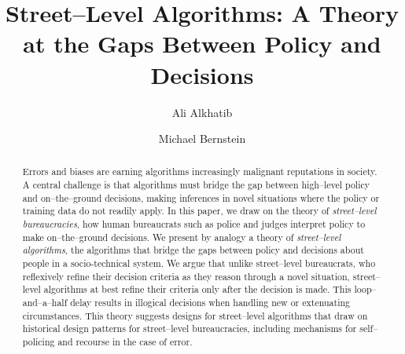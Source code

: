 \documentclass[sigchi]{acmart}
\newcommand{\ali}[1]{{\color{Red}[al2: #1]}}
\newcommand{\thesis}[1]{{\color{Orange}{#1}}}
\newcommand{\topic}[1]{{\color{Blue}#1}} %
\newcommand{\onlyinsubfile}[1]{#1}
\newcommand{\notinsubfile}[1]{}
\renewcommand{\topic}[1]{#1} %
\renewcommand{\thesis}[1]{#1} %
\begin{document}
\renewcommand{\topic}[1]{#1} %
\renewcommand{\thesis}[1]{#1} %
\renewcommand{\notinsubfile}[1]{#1}
\renewcommand{\onlyinsubfile}[1]{}

\title[Street--Level Algorithms]{Street--Level Algorithms: A Theory at the Gaps Between Policy and Decisions}


\author{Ali Alkhatib}

\author{Michael Bernstein}

\renewcommand{\shortauthors}{Alkhatib and Bernstein}


\begin{abstract}
Errors and biases are earning algorithms increasingly malignant reputations in society.
A central challenge is that algorithms must bridge the gap between
high--level policy and on--the--ground decisions,
making inferences in novel situations where the policy or training data do not readily apply.
In this paper,
we draw on the theory of \textit{street--level bureaucracies},
how human bureaucrats such as police and judges interpret policy to make on--the--ground decisions.
We present by analogy a theory of \textit{street--level algorithms},
the algorithms that bridge the gaps between policy and decisions about people in a socio-technical system.
We argue that unlike
street--level bureaucrats, who reflexively refine their decision criteria as they reason through a novel situation,
street--level algorithms at best refine their criteria only after the decision is made.
This loop--and--a--half delay results in illogical decisions when handling new or extenuating circumstances.
This theory suggests designs for street--level algorithms that draw on
historical design patterns for street--level bureaucracies, including
mechanisms for self--policing and recourse in the case of error.
\end{abstract}
\end{document}
